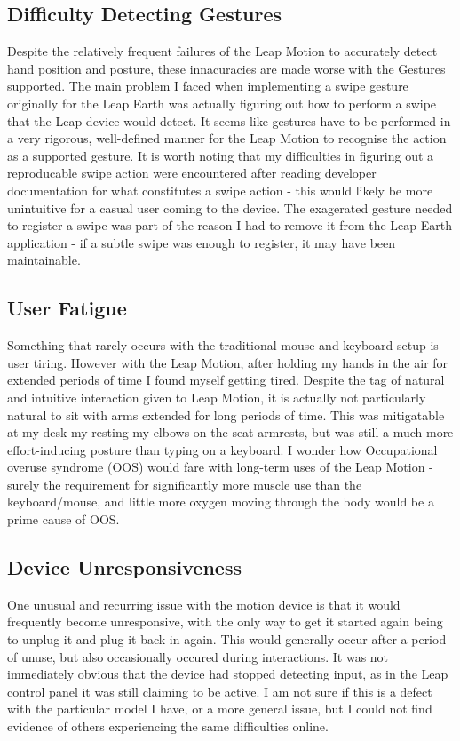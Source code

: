 \documentclass{sigplanconf}
\begin{document}
\subsection{Difficulty Detecting Gestures}

Despite the relatively frequent failures of the Leap Motion to accurately detect hand position and posture, these innacuracies are made worse with the Gestures supported. The main problem I faced when implementing a swipe gesture originally for the Leap Earth was actually figuring out how to perform a swipe that the Leap device would detect. It seems like gestures have to be performed in a very rigorous, well-defined manner for the Leap Motion to recognise the action as a supported gesture. It is worth noting that my difficulties in figuring out a reproducable swipe action were encountered after reading developer documentation for what constitutes a swipe action - this would likely be more unintuitive for a casual user coming to the device. The exagerated gesture needed to register a swipe was part of the reason I had to remove it from the Leap Earth application - if a subtle swipe was enough to register, it may have been maintainable.

\subsection{User Fatigue}

Something that rarely occurs with the traditional mouse and keyboard setup is user tiring. However with the Leap Motion, after holding my hands in the air for extended periods of time I found myself getting tired. Despite the tag of natural and intuitive interaction given to Leap Motion, it is actually not particularly natural to sit with arms extended for long periods of time. This was mitigatable at my desk my resting my elbows on the seat armrests, but was still a much more effort-inducing posture than typing on a keyboard. I wonder how Occupational overuse syndrome (OOS) would fare with long-term uses of the Leap Motion - surely the requirement for significantly more muscle use than the keyboard/mouse, and little more oxygen moving through the body would be a prime cause of OOS.

\subsection{Device Unresponsiveness}

One unusual and recurring issue with the motion device is that it would frequently become unresponsive, with the only way to get it started again being to unplug it and plug it back in again. This would generally occur after a period of unuse, but also occasionally occured during interactions. It was not immediately obvious that the device had stopped detecting input, as in the Leap control panel it was still claiming to be active. I am not sure if this is a defect with the particular model I have, or a more general issue, but I could not find evidence of others experiencing the same difficulties online.
\end{document}
